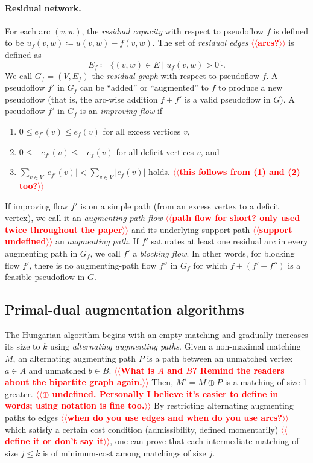 \documentclass[11pt]{article}
\makeatletter
\theoremstyle{plain}
\def\n@te#1{\textsf{\boldmath \textbf{$\langle\!\langle$#1$\rangle\!\rangle$}}\leavevmode}
\def\note#1{\textcolor{red}{\n@te{#1}}}
\makeatother
\begin{document}
\paragraph{Residual network.}
For each arc $(v, w)$, the \emph{residual capacity} with respect to
pseudoflow $f$ is defined to be $u_f(v, w) \coloneqq u(v, w) - f(v, w)$.
The set of \emph{residual edges} \note{arcs?} is defined as
\[
E_f \coloneqq \{(v, w) \in E \mid u_f(v, w) > 0\}.
\]
We call $G_f = (V, E_f)$ the \emph{residual graph} with respect to pseudoflow $f$.
A pseudoflow $f'$ in $G_f$ can be ``added'' or ``augmented'' to $f$ to produce
a new pseudoflow (that is, the arc-wise addition $f + f'$ is a valid pseudoflow
in $G$).
A pseudoflow $f'$ in $G_f$ is an \emph{improving flow} if
\begin{enumerate}[(1)]\itemsep=0pt
\item
$0 \leq e_{f'}(v) \leq e_f(v)$ for all excess vertices $v$,
\item
$0 \leq -e_{f'}(v) \leq -e_f(v)$ for all deficit vertices $v$, and
\item $\sum_{v \in V} |e_{f'}(v)| < \sum_{v \in V} |e_f(v)|$ holds. \note{this follows from (1) and (2) too?}
\end{enumerate}
If improving flow $f'$ is on a simple path (from an excess vertex to a deficit
vertex), we call it an \emph{augmenting-path flow} \note{path flow for short? only used twice throughout the paper} and its underlying support path \note{support undefined} an
\emph{augmenting path}.
If $f'$ saturates at least one residual arc in every augmenting path in $G_f$,
we call $f'$ a \emph{blocking flow}.
In other words, for blocking flow $f'$, there is no augmenting-path flow
$f''$ in $G_f$ for which $f + (f' + f'')$ is a feasible pseudoflow in $G$.

\subsection{Primal-dual augmentation algorithms}

The Hungarian algorithm begins with an empty matching and gradually increases its size to $k$ using \emph{alternating augmenting paths}.
Given a non-maximal matching $M$, an alternating augmenting path $P$ is a path
between an unmatched vertex $a \in A$ and unmatched $b \in B$.
\note{What is $A$ and $B$? Remind the readers about the bipartite graph again.}
Then, $M' = M \oplus P$ is a matching of size 1 greater.
\note{$\oplus$ undefined.  Personally I believe it's easier to define in words; using notation is fine too.}
By restricting alternating augmenting paths to edges \note{when do you use edges and when do you use arcs?}
which satisfy a certain
cost condition (admissibility, defined momentarily) \note{define it or don't say it}, one can prove that each
intermediate matching of size $j \leq k$ is of minimum-cost among matchings of size $j$.
\end{document}
